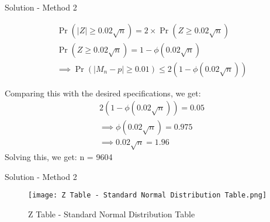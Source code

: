 \documentclass{beamer}
\providecommand{\abs}[1]{\vert#1\vert}
\providecommand{\pr}[1]{\ensuremath{\Pr\left(#1\right)}}
\begin{document}
\begin{frame}{Solution - Method 2}

\begin{block}{}
\begin{align}
 \pr{\abs{Z} \geq 0.02 \sqrt{n}} = 2\times \pr{Z \geq 0.02 \sqrt{n}}\\
 \pr{Z \geq 0.02 \sqrt{n}} = 1-\phi(0.02\sqrt{n})\\
 \implies \pr{\abs{M_n - p} \geq 0.01} \leq 2 (1-\phi(0.02\sqrt{n}))
\end{align}
\end{block}

\begin{block}{}
Comparing this with the desired specifications, we get:
\begin{align}
  2 (1-\phi(0.02\sqrt{n})) = 0.05\\
  \implies \phi(0.02\sqrt{n}) = 0.975\\
  \implies 0.02\sqrt{n} = 1.96
\end{align}
Solving this, we get: 
n = 9604
\end{block}
\end{frame}

\begin{frame}{Solution - Method 2}
    \begin{figure}[ht]
    \centering
    \texttt{[image: Z Table - Standard Normal Distribution Table.png]}
    \caption{Z Table - Standard Normal Distribution Table}
    \label{Z Table - Standard Normal Distribution Table}
\end{figure}
\end{frame}
\end{document}

